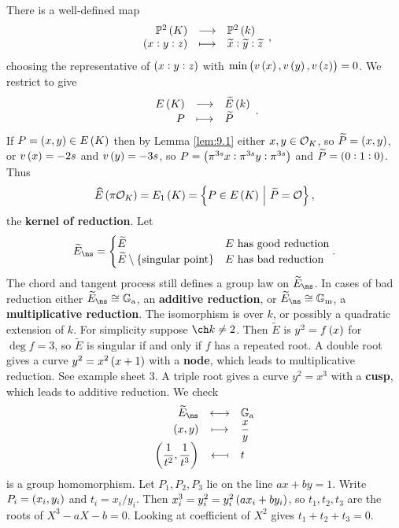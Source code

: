 \pagebreak

There is a well-defined map
$$ \function{\PP^2\br{K}}{\PP^2\br{k}}{\br{x : y : z}}{\widetilde{x} : \widetilde{y} : \widetilde{z}}, $$
choosing the representative of $ \br{x : y : z} $ with $ \min\br{v\br{x}, v\br{y}, v\br{z}} = 0 $. We restrict to give
$$ \function{E\br{K}}{\widetilde{E}\br{k}}{P}{\widetilde{P}}. $$
If $ P = \br{x, y} \in E\br{K} $ then by Lemma \ref{lem:9.1} either $ x, y \in \mathcal{O}_K $, so $ \widetilde{P} = \br{x, y} $, or $ v\br{x} = -2s $ and $ v\br{y} = -3s $, so $ P = \br{\pi^{3s}x : \pi^{3s}y : \pi^{3s}} $ and $ \widetilde{P} = \br{0 : 1 : 0} $. Thus
$$ \widehat{E}\br{\pi\OOO_K} = E_1\br{K} = \cbr{P \in E\br{K} \st \widetilde{P} = \OOO}, $$
the \textbf{kernel of reduction}. Let
$$ \widetilde{E}_{\ns} =
\begin{cases}
\widetilde{E} & E \ \text{has good reduction} \\
\widetilde{E} \setminus \cbr{\text{singular point}} & E \ \text{has bad reduction}
\end{cases}.
$$
The chord and tangent process still defines a group law on $ \widetilde{E}_{\ns} $. In cases of bad reduction either $ \widetilde{E}_{\ns} \cong \GG_\a $, an \textbf{additive reduction}, or $ \widetilde{E}_{\ns} \cong \GG_\m $, a \textbf{multiplicative reduction}. The isomorphism is over $ k $, or possibly a quadratic extension of $ k $. For simplicity suppose $ \ch k \ne 2 $. Then $ \widetilde{E} $ is $ y^2 = f\br{x} $ for $ \deg f = 3 $, so $ \widetilde{E} $ is singular if and only if $ f $ has a repeated root. A double root gives a curve $ y^2 = x^2\br{x + 1} $ with a \textbf{node}, which leads to multiplicative reduction. See example sheet $ 3 $. A triple root gives a curve $ y^2 = x^3 $ with a \textbf{cusp}, which leads to additive reduction. We check
$$ \bijection{\widetilde{E}_{\ns}}{\GG_\a}{\br{x, y}}{\dfrac{x}{y}}{\br{\dfrac{1}{t^2}, \dfrac{1}{t^3}}}{t} $$
is a group homomorphism. Let $ P_1, P_2, P_3 $ lie on the line $ ax + by = 1 $. Write $ P_i = \br{x_i, y_i} $ and $ t_i = x_i / y_i $. Then $ x_i^3 = y_i^2 = y_i^2\br{ax_i + by_i} $, so $ t_1, t_2, t_3 $ are the roots of $ X^3 - aX - b = 0 $. Looking at coefficient of $ X^2 $ gives $ t_1 + t_2 + t_3 = 0 $.


